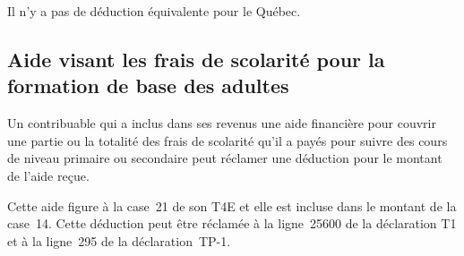 Il n'y a pas de déduction équivalente pour le Québec. 


\subsection{Aide visant les frais de scolarité pour la formation de base des adultes}
Un contribuable qui a inclus dans ses revenus une aide financière pour couvrir une partie ou la totalité des frais de scolarité qu'il a payés pour suivre des cours de niveau primaire ou secondaire peut réclamer une déduction pour le montant de l'aide reçue. 

Cette aide figure à la case~21 de son T4E et elle est incluse dans le montant de la case~14. Cette déduction peut être réclamée à la ligne~25600 de la déclaration T1 et à la ligne~295 de la déclaration~TP-1. 


